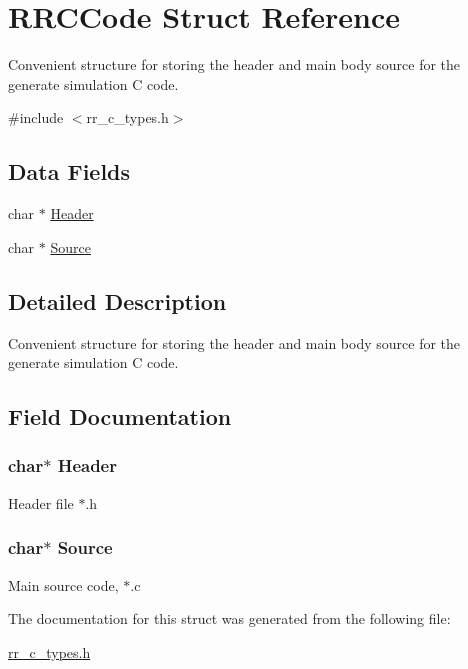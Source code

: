 \hypertarget{struct_r_r_c_code}{
\section{\-R\-R\-C\-Code \-Struct \-Reference}
\label{struct_r_r_c_code}
}


\-Convenient structure for storing the header and main body source for the generate simulation \-C code.  




{\ttfamily \#include $<$rr\-\_\-c\-\_\-types.\-h$>$}

\subsection*{\-Data \-Fields}
\begin{DoxyCompactItemize}
\item 
char $\ast$ \hyperlink{struct_r_r_c_code_a129503fa396e877e8400bb7cdc9774b5}{\-Header}
\item 
char $\ast$ \hyperlink{struct_r_r_c_code_a23fa2e731d8e1576c9095868b9651305}{\-Source}
\end{DoxyCompactItemize}


\subsection{\-Detailed \-Description}
\-Convenient structure for storing the header and main body source for the generate simulation \-C code. 

\subsection{\-Field \-Documentation}
\hypertarget{struct_r_r_c_code_a129503fa396e877e8400bb7cdc9774b5}{
\subsubsection[{\-Header}]{\setlength{\rightskip}{0pt plus 5cm}char$\ast$ {\bf \-Header}}}
\label{struct_r_r_c_code_a129503fa396e877e8400bb7cdc9774b5}
\-Header file $\ast$.h \hypertarget{struct_r_r_c_code_a23fa2e731d8e1576c9095868b9651305}{
\subsubsection[{\-Source}]{\setlength{\rightskip}{0pt plus 5cm}char$\ast$ {\bf \-Source}}}
\label{struct_r_r_c_code_a23fa2e731d8e1576c9095868b9651305}
\-Main source code, $\ast$.c 

\-The documentation for this struct was generated from the following file\-:\begin{DoxyCompactItemize}
\item 
\hyperlink{rr__c__types_8h}{rr\-\_\-c\-\_\-types.\-h}\end{DoxyCompactItemize}

